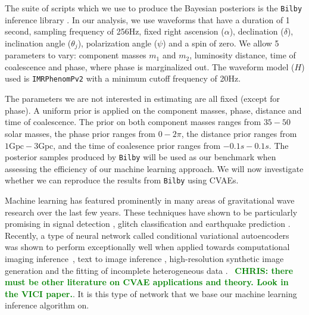 \documentclass[%
showpacs,
 amsmath,amssymb,
 aps,
 twocolumn,
 prl,
 reprint,
floatfix,
]{revtex4-1}
\newcommand{\chris}[1]{\textbf{\textcolor{green}{CHRIS: #1}}}
\begin{document}
%
%
The suite of scripts which we use to produce the Bayesian posteriors is the \texttt{Bilby}
inference library \cite{1811.02042}. In our analysis, we use waveforms 
that have a duration of 1 second, sampling frequency of 256Hz, fixed right ascension ($\alpha$),
declination ($\delta$), inclination angle ($\theta_j$), polarization angle
($\psi$) and a spin of zero. We allow 5 parameters to vary: component masses
$m_1$ and $m_2$, luminosity distance, time of coalescence and phase, where
phase is marginalized out. The waveform model ($H$) used is \texttt{IMRPhenomPv2}
\cite{1809.10113} with a minimum cutoff frequency of 20Hz.

%
%
The parameters we are not interested in estimating are all fixed (except for phase). 
A uniform prior is applied on the component masses, phase, distance and time of 
coalescence. The prior on both component
masses ranges from $35 - 50$ solar masses, the phase prior ranges from $0 -
2\pi$, the distance prior ranges from $1\textrm{Gpc} - 3\textrm{Gpc}$, and the
time of coalesence prior ranges from $-0.1s - 0.1s$. The posterior samples produced 
by \texttt{Bilby} will be used as our benchmark when assessing the efficiency of our
machine learning approach.  We will now investigate whether we can reproduce
the results from \texttt{Bilby} using \ac{CVAE}s. 
   

%
%
Machine learning has featured prominently in many areas of gravitational wave
research over the last few years.  These techniques have shown to be
particularly promising in signal detection
\cite{PhysRevLett.120.141103,GEORGE201864,1904.08693}, glitch classification
\cite{1706.07446,0264-9381-34-6-064003} and earthquake prediction
\cite{Coughlin_2017}. Recently, a type of neural network called
conditional variational autoencoders was shown to perform exceptionally well
when applied towards computational imaging
inference~\cite{1904.06264,NIPS2015_5775}, text to image inference \cite{}, 
high-resolution synthetic image generation \cite{Ngyun} and the fitting 
of incomplete heterogeneous data \cite{Nazabal}. ~\chris{there must be other literature on CVAE
applications and theory. Look in the VICI paper.}. It is this type of
network that we base our machine learning inference algorithm on.
\end{document}
